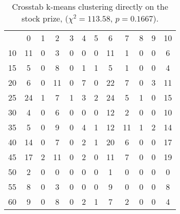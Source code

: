 
\begin{table}
	\centering
	\caption{Crosstab k-means clustering directly on the stock prize, ($\chi^2 = 113.58$, $p = 0.1667$).}
	\label{tbl:k-means-euc-direct}
	\begin{tabular}{lccccccccccc}
		  & 0  & 1 & 2  & 3 & 4 & 5 & 6  & 7  & 8 & 9 & 10 \\
		10 & 11 & 0 & 3  & 0 & 0 & 0 & 11 & 1  & 0 & 0 & 6  \\
		15 & 5  & 0 & 8  & 0 & 1 & 1 & 5  & 1  & 0 & 0 & 4  \\
		20 & 6  & 0 & 11 & 0 & 7 & 0 & 22 & 7  & 0 & 3 & 11 \\
		25 & 24 & 1 & 7  & 1 & 3 & 2 & 24 & 5  & 1 & 0 & 15 \\
		30 & 4  & 0 & 6  & 0 & 0 & 0 & 12 & 2  & 0 & 0 & 10 \\
		35 & 5  & 0 & 9  & 0 & 4 & 1 & 12 & 11 & 1 & 2 & 14 \\
		40 & 14 & 0 & 7  & 0 & 2 & 1 & 20 & 6  & 0 & 0 & 17 \\
		45 & 17 & 2 & 11 & 0 & 2 & 0 & 11 & 7  & 0 & 0 & 19 \\
		50 & 2  & 0 & 0  & 0 & 0 & 0 & 1  & 0  & 0 & 0 & 0  \\
		55 & 8  & 0 & 3  & 0 & 0 & 0 & 9  & 0  & 0 & 0 & 8  \\
		60 & 9  & 0 & 8  & 0 & 2 & 1 & 7  & 2  & 0 & 0 & 4 
	\end{tabular}
\end{table}